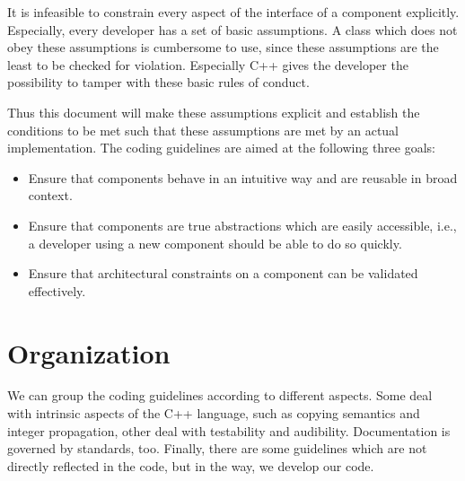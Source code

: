 %
It is infeasible to constrain every aspect of the interface of a
component explicitly. Especially, every developer has a set of basic
assumptions. A class which does not obey these assumptions is
cumbersome to use, since these assumptions are the least to be checked
for violation. Especially C++ gives the developer the possibility to
tamper with these basic rules of conduct.
%

Thus this document will make these assumptions explicit and establish
the conditions to be met such that these assumptions are met by an
actual implementation. The coding guidelines are aimed at the
following three goals:
\begin{itemize}
\item Ensure that components behave in an intuitive way and are
  reusable in broad context.
\item Ensure that components are true abstractions which are easily
  accessible, i.e., a developer using a new component should be able
  to do so quickly. 
\item Ensure that architectural constraints on a component can be
  validated effectively.
\end{itemize}
%


\section{Organization}
\label{sec:organization}


We can group the coding guidelines according to different aspects.
Some deal with intrinsic aspects of the C++ language, such as copying
semantics and integer propagation, other deal with testability and
audibility. Documentation is governed by standards, too. Finally,
there are some guidelines which are not directly reflected in the
code, but in the way, we develop our code.

